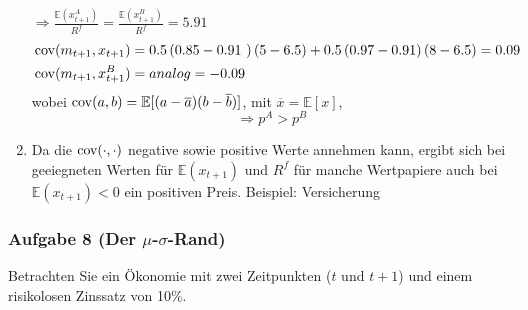 \documentclass[12pt]{extreport} %
\theoremstyle{named}
\theoremstyle{nnamed}
\theoremstyle{itshape}
\theoremstyle{normal}
\begin{document}
\begin{enumerate}
		$\Rightarrow \frac{\mathbb{E}(x_{t+1}^A)}{R^f} = \frac{\mathbb{E}(x_{t+1}^B)}{R^f} = 5.91$
		\begin{align*}
			& \cov(m_{t+1}, x_{t+1}) = 0.5 \left( 0.85 - 0.91 \right) \left( 5 - 6.5 \right) + 0.5 \left(0.97 - 0.91 \right) \left( 8 - 6.5 \right) = 0.09 \\
			& \cov(m_{t+1}, x_{t+1}^B) = analog = -0.09 
		\end{align*}
		wobei $\operatorname{cov}(a, b) = \mathbb{E}[(a - \overline{a})(b - \overline{b})]$, mit $\overline{x} = \mathbb{E}[x]$, 
	$$\Rightarrow p^A > p^B$$
	\item Da die $\operatorname{cov}(\cdot, \cdot)$ negative sowie positive Werte annehmen kann, ergibt sich bei geeiegneten Werten für $\mathbb{E}(x_{t+1})$ und $R^f$ für manche Wertpapiere auch bei $\mathbb{E}(x_{t+1}) < 0$ ein positiven Preis. Beispiel: Versicherung
\end{enumerate}

\newpage

\subsubsection*{Aufgabe 8 (Der $\mu$-$\sigma$-Rand)}

Betrachten Sie ein Ökonomie mit zwei Zeitpunkten ($t$ und $t+1$) und einem risikolosen Zinssatz von 10\%.
\end{document}
